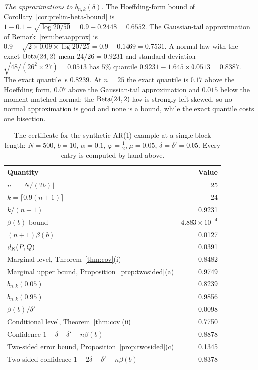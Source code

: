 \documentclass[../../../main.tex]{subfiles}
\begin{document}
\emph{The approximations to $b_{n,k}(\delta)$.} The Hoeffding-form bound of Corollary~\ref{cor:prelim-beta-bound} is $1-0.1-\sqrt{\log20/50}=0.9-0.2448=0.6552$. The Gaussian-tail approximation of Remark~\ref{rem:betaapprox} is $0.9-\sqrt{2\times0.09\times\log20/25}=0.9-0.1469=0.7531$. A normal law with the exact $\operatorname{Beta}(24,2)$ mean $24/26=0.9231$ and standard deviation $\sqrt{48/(26^2\times27)}=0.0513$ has $5\%$ quantile $0.9231-1.645\times0.0513=0.8387$. The exact quantile is $0.8239$. At $n=25$ the exact quantile is $0.17$ above the Hoeffding form, $0.07$ above the Gaussian-tail approximation and $0.015$ below the moment-matched normal; the $\operatorname{Beta}(24,2)$ law is strongly left-skewed, so no normal approximation is good and none is a bound, while the exact quantile costs one bisection.

\begin{table}[htbp]
\centering\small
\caption{The certificate for the synthetic AR(1) example at a single block length: $N=500$, $b=10$, $\alpha=0.1$, $\varphi=\tfrac12$, $\mu=0.05$, $\delta=\delta'=0.05$. Every entry is computed by hand above.}\label{tab:example}
\begin{tabular}{@{}lr@{}}
\toprule
Quantity & Value \\
\midrule
$n=\lfloor N/(2b)\rfloor$ & 25 \\
$k=\lceil0.9(n+1)\rceil$ & 24 \\
$k/(n+1)$ & 0.9231 \\
$\beta(b)$ bound & $4.883\times10^{-4}$ \\
$(n+1)\beta(b)$ & 0.0127 \\
$d_{\mathrm{K}}(P,Q)$ & 0.0391 \\
Marginal level, Theorem~\ref{thm:cov}(i) & 0.8482 \\
Marginal upper bound, Proposition~\ref{prop:twosided}(a) & 0.9749 \\
$b_{n,k}(0.05)$ & 0.8239 \\
$b_{n,k}(0.95)$ & 0.9856 \\
$\beta(b)/\delta'$ & 0.0098 \\
Conditional level, Theorem~\ref{thm:cov}(ii) & 0.7750 \\
Confidence $1-\delta-\delta'-n\beta(b)$ & 0.8878 \\
Two-sided error bound, Proposition~\ref{prop:twosided}(c) & 0.1345 \\
Two-sided confidence $1-2\delta-\delta'-n\beta(b)$ & 0.8378 \\
\bottomrule
\end{tabular}
\end{table}
\end{document}
